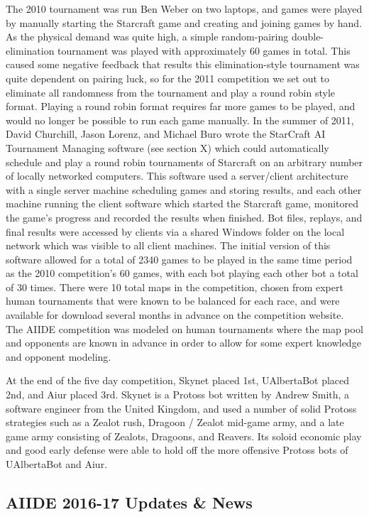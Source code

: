 The 2010 tournament was run Ben Weber on two laptops, and games were played by manually starting the Starcraft game and creating and joining games by hand. As the physical demand was quite high, a simple random-pairing double-elimination tournament was played with approximately 60 games in total. This caused some negative feedback that results this elimination-style tournament was quite dependent on pairing luck, so for the 2011 competition we set out to eliminate all randomness from the tournament and play a round robin style format. Playing a round robin format requires far more games to be played, and would no longer be possible to run each game manually. In the summer of 2011, David Churchill, Jason Lorenz, and Michael Buro wrote the StarCraft AI Tournament Managing software (see section X) which could automatically schedule and play a round robin tournaments of Starcraft on an arbitrary number of locally networked computers. This software used a server/client architecture with a single server machine scheduling games and storing results, and each other machine running the client software which started the Starcraft game, monitored the game's progress and recorded the results when finished. Bot files, replays, and final results were accessed by clients via a shared Windows folder on the local network which was visible to all client machines. The initial version of this software allowed for a total of 2340 games to be played in the same time period as the 2010 competition's 60 games, with each bot playing each other bot a total of 30 times. There were 10 total maps in the competition, chosen from expert human tournaments that were known to be balanced for each race, and were available for download several months in advance on the competition website. The AIIDE competition was modeled on human tournaments where the map pool and opponents are known in advance in order to allow for some expert knowledge and opponent modeling.

At the end of the five day competition, Skynet placed 1st, UAlbertaBot placed 2nd, and Aiur placed 3rd. Skynet is a Protoss bot written by Andrew Smith, a software engineer from the United Kingdom, and used a number of solid Protoss strategies such as a Zealot rush, Dragoon / Zealot mid-game army, and a late game army consisting of Zealots, Dragoons, and Reavers. Its soloid economic play and good early defense were able to hold off the more offensive Protoss bots of UAlbertaBot and Aiur.

\subsection{AIIDE 2016-17 Updates \& News}\label{subsecAIIDEnews}

